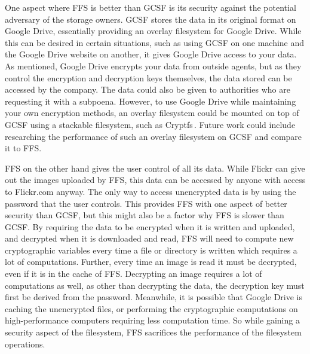 One aspect where \gls{FFS} is better than \gls{GCSF} is its security against the potential adversary of the storage owners. \gls{GCSF} stores the data in its original format on Google Drive, essentially providing an overlay filesystem for Google Drive. While this can be desired in certain situations, such as using \gls{GCSF} on one machine and the Google Drive website on another, it gives Google Drive access to your data. As mentioned, Google Drive encrypts your data from outside agents, but as they control the encryption and decryption keys themselves, the data stored can be accessed by the company. The data could also be given to authorities who are requesting it with a subpoena. However, to use Google Drive while maintaining your own encryption methods, an overlay filesystem could be mounted on top of \gls{GCSF} using a stackable filesystem, such as Cryptfs\,\cite{zadokCryptfsStackableVnode1998}. Future work could include researching the performance of such an overlay filesystem on \gls{GCSF} and compare it to \gls{FFS}.

\gls{FFS} on the other hand gives the user control of all its data. While Flickr can give out the images uploaded by \gls{FFS}, this data can be accessed by anyone with access to Flickr.com anyway. The only way to access unencrypted data is by using the password that the user controls. This provides \gls{FFS} with one aspect of better security than \gls{GCSF}, but this might also be a factor why \gls{FFS} is slower than \gls{GCSF}. By requiring the data to be encrypted when it is written and uploaded, and decrypted when it is downloaded and read, \gls{FFS} will need to compute new cryptographic variables every time a file or directory is written which requires a lot of computations. Further, every time an image is read it must be decrypted, even if it is in the cache of \gls{FFS}. Decrypting an image requires a lot of computations as well, as other than decrypting the data, the decryption key must first be derived from the password. Meanwhile, it is possible that Google Drive is caching the unencrypted files, or performing the cryptographic computations on \mbox{high-performance} computers requiring less computation time. So while gaining a security aspect of the filesystem, \gls{FFS} sacrifices the performance of the filesystem operations.

